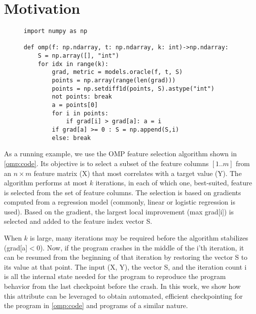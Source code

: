 
\section{Motivation}
\label{motivation}


\begin{figure}[t]
\begin{lstlisting}
import numpy as np

def omp(f: np.ndarray, t: np.ndarray, k: int)->np.ndarray:
    S = np.array([], "int")
    for idx in range(k):
        grad, metric = models.oracle(f, t, S)
        points = np.array(range(len(grad)))
        points = np.setdiff1d(points, S).astype("int")
        not points: break
        a = points[0]
        for i in points:
            if grad[i] > grad[a]: a = i
        if grad[a] >= 0 : S = np.append(S,i)
        else: break
\end{lstlisting}
\caption{\label{omp:code}}
\end{figure}

As a running example, we use the OMP feature selection algorithm \cite{mallat1993matching, elenberg2018restricted} shown in \autoref{omp:code}.
Its objective is to select a subset of the feature columns $[1..m]$ from an $n\times m$  feature matrix (X) that most correlates with a target value (Y).
The algorithm performs at most $k$ iterations, in each of which one, best-suited, feature is selected from the set of feature columns.
The selection is based on gradients computed from a regression model (commonly, linear or logistic regression is used).
Based on the gradient, the largest local improvement (max grad[i]) is selected and added to the feature index vector S.

When $k$ is large, many iterations may be required before the algorithm stabilizes (grad[a]${}<0$).
Now, if the program crashes in the middle of the i'th iteration, it can be resumed from the beginning of that iteration by restoring the vector S to its value at that point.
The input (X, Y), the vector S, and the iteration count i is all the internal state needed for the program to reproduce the program behavior from the last checkpoint before the crash.
In this work, we show how this attribute can be leveraged to obtain automated, efficient checkpointing for the program in \autoref{omp:code} and programs of a similar nature.

